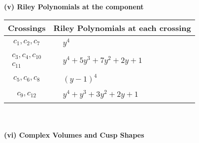 \documentclass[1p]{elsarticle_modified}
\theoremstyle{definition}
\begin{document}
\newpage\renewcommand{\arraystretch}{1}
\flushleft \textbf{(v) Riley Polynomials at the component}\newline \\
\begin{tabular}{m{50pt}|m{274pt}}
Crossings & \hspace{64pt}Riley Polynomials at each crossing \\
\hline $$\begin{aligned}c_{1},c_{2},c_{7}\end{aligned}$$&$\begin{aligned}
&y^4
\end{aligned}$\\
\hline $$\begin{aligned}c_{3},c_{4},c_{10}\\c_{11}\end{aligned}$$&$\begin{aligned}
&y^4+5 y^3+7 y^2+2 y+1
\end{aligned}$\\
\hline $$\begin{aligned}c_{5},c_{6},c_{8}\end{aligned}$$&$\begin{aligned}
&(y-1)^4
\end{aligned}$\\
\hline $$\begin{aligned}c_{9},c_{12}\end{aligned}$$&$\begin{aligned}
&y^4+y^3+3 y^2+2 y+1
\end{aligned}$\\
\hline
\end{tabular}\\~\\
\newpage\flushleft \textbf{(vi) Complex Volumes and Cusp Shapes}
\end{document}
